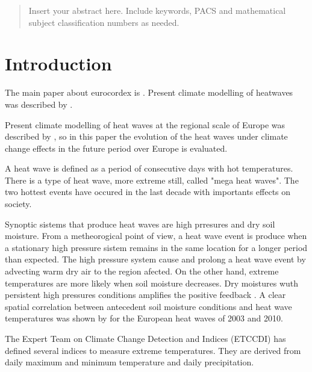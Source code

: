 \date{Received: date / Accepted: date}


\maketitle

\begin{abstract}
Insert your abstract here. Include keywords, PACS and mathematical
subject classification numbers as needed.
\end{abstract}

\section{Introduction}
\label{introduction}
The main paper about eurocordex is \cite{jac_al2014}. Present climate
modelling of heatwaves was described by \cite{vau_al2013}.

Present climate modelling of heat waves at the regional scale of Europe was described by \cite{vau_al2013}, so in this paper the evolution of the heat waves under climate change effects in the future period over Europe is evaluated.

A heat wave is defined as a period of consecutive days with hot temperatures. There is a type of heat wave, more extreme still, called "mega heat waves". The two hottest events have occured in the last decade \cite{bar_al2011} with importants effects on society. 

Synoptic sistems that produce heat waves are high prresures and dry soil moisture. From a metheorogical point of view, a heat wave event is produce when a stationary high pressure sistem remains in the same location for a longer period than expected. The high pressure system cause and prolong a heat wave event by advecting warm dry air to the region afected. On the other hand, extreme temperatures are more likely when soil moisture decreases. Dry moistures wuth persistent high pressures conditions amplifies the positive feedback \cite{Perkins_2015}. A clear spatial correlation between antecedent soil moisture conditions and heat wave temperatures was shown by \cite{Sil_al2017} for the European heat waves of 2003 and 2010. 
 

The Expert Team on Climate Change Detection and Indices (ETCCDI) has defined several indices to measure extreme temperatures. They are derived from daily maximum and minimum temperature and daily precipitation.    

